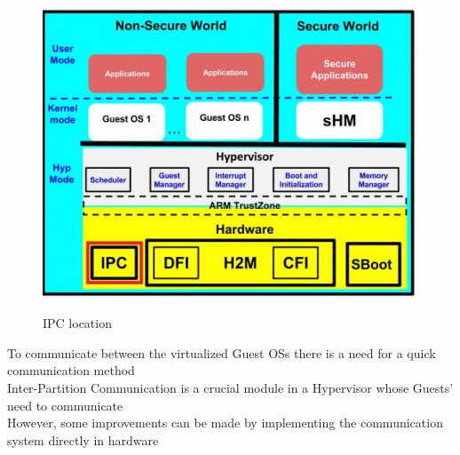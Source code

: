 \begin{figure}[!htbp]
\center
\label{figure7}
\includegraphics[scale=0.35]{Figures/IPC} \\
\caption {IPC location}
\end{figure}
To communicate between the virtualized Guest OSs there is a need for a quick communication method\\
\indent Inter-Partition Communication is a crucial module in a Hypervisor whose Guests’ need to communicate\\
\indent However, some improvements can be made by implementing the communication system directly in hardware